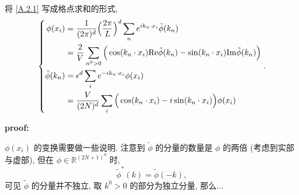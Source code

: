 \begin{itemize}
\begin{tcolorbox}[title=proof:]
		将 \eqref{A.2.1} 写成格点求和的形式,
		\begin{equation} \label{A.2.5}
			\begin{dcases}
				\begin{aligned}
					\phi(x_i) &= \frac{1}{(2 \pi)^d} \Big( \frac{2 \pi}{L} \Big)^d \sum_n e^{i k_n \cdot x_i} \tilde{\phi}(k_n) \\
					&= \frac{2}{V} \sum_{n^0 > 0} \Big( \cos(k_n \cdot x_i) \mathrm{Re} \tilde{\phi}(k_n) - \sin(k_n \cdot x_i) \mathrm{Im} \tilde{\phi}(k_n) \Big) \\
					\tilde{\phi}(k_n) &= \epsilon^d \sum_i e^{- i k_n \cdot x_i} \phi(x_i) \\
					&= \frac{V}{(2 N)^d} \sum_i \Big( \cos(k_n \cdot x_i) - i \sin(k_n \cdot x_i) \Big) \phi(x_i)
				\end{aligned}
			\end{dcases}.
		\end{equation}
		
		\noindent\hdashrule[0.5ex]{\linewidth}{0.5pt}{1mm} %
		
		\textbf{proof:}
		
		$\phi(x_i)$ 的变换需要做一些说明. 注意到 $\tilde{\phi}$ 的分量的数量是 $\phi$ 的两倍 (考虑到实部与虚部), 但在 $\phi \in \mathbb{R}^{(2 N + 1)^d}$ 时,
		\begin{equation}
			\tilde{\phi}^*(k) = \tilde{\phi}(- k),
		\end{equation}
		可见 $\tilde{\phi}$ 的分量并不独立, 取 $k^0 > 0$ 的部分为独立分量, 那么...
		
		\noindent\hdashrule[0.5ex]{\linewidth}{0.5pt}{1mm} %
		

\end{tcolorbox}
\end{itemize}
